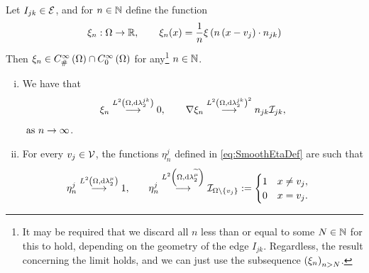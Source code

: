 \begin{lemma} \label{lem:SI-SmoothFunctionsResults}
	Let $I_{jk}\in\mathcal{E}$, and for $n\in\mathbb{N}$ define the function 
		\begin{align*}
			\xi_n:\Omega\rightarrow\mathbb{R}, \qquad \xi_n(x) = \frac{1}{n}\xi\left( n\left( x-v_j \right)\cdot n_{jk} \right)
		\end{align*}
		Then $\xi_n\in C^{\infty}_{\#}\left( \Omega \right)\cap C^{\infty}_{0}\left( \Omega \right)$ for any\footnote{It may be required that we discard all  $n$ less than or equal to some $N\in\mathbb{N}$ for this to hold, depending on the geometry of the edge $I_{jk}$. Regardless, the result concerning the limit holds, and we can just use the subsequence $\left( \xi_n \right)_{n>N}$.} $n\in\mathbb{N}$.
	\begin{enumerate}[(i)]
		\item  We have that
		\begin{align*}
			\xi_n \overset{L^{2}\left( \Omega,\mathrm{d} \lambda_2^{jk} \right)}{\longrightarrow} 0, \qquad
			\nabla\xi_n \overset{L^{2}\left( \Omega,\mathrm{d} \lambda_2^{jk} \right)^2}{\longrightarrow} n_{jk}\mathcal{I}_{jk},
		\end{align*}
		$\ \text{as} \ n \rightarrow\infty$.
		\item For every $v_j\in\mathcal{V}$, the functions $\eta_n^j$ defined in \eqref{eq:SmoothEtaDef} are such that
		\begin{align*}
			\eta_n^j \overset{L^{2}\left( \Omega,\mathrm{d} \lambda_2^{\mu} \right)}{\longrightarrow} 1,
			&\qquad
			\eta_n^j \overset{L^{2}\left( \Omega,\mathrm{d} \lambda_2^{\widetilde{\mu}} \right)}{\longrightarrow} \mathcal{I}_{\Omega\setminus\left\{ v_j \right\}} := \begin{cases} 1 & x\neq v_j, \\ 0 & x=v_j. \end{cases}
		\end{align*}
	\end{enumerate}
\end{lemma}
